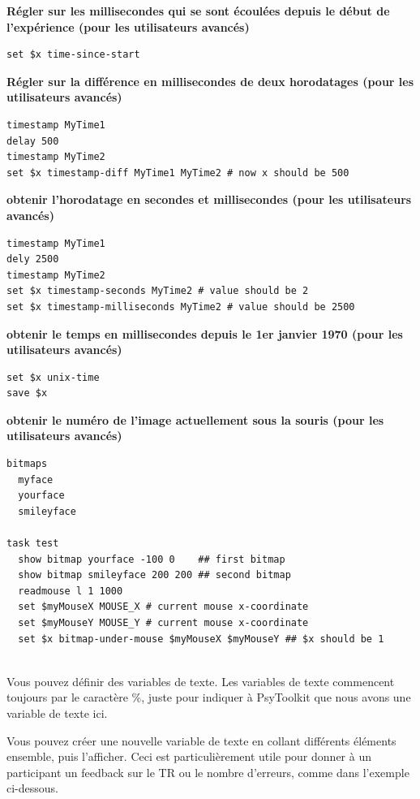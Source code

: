 \documentclass[
]{book}
\begin{document}
\textbf{Régler sur les millisecondes qui se sont écoulées depuis le début de l'expérience (pour les utilisateurs avancés)}

\begin{verbatim}
set $x time-since-start
\end{verbatim}

\textbf{Régler sur la différence en millisecondes de deux horodatages (pour les utilisateurs avancés)}

\begin{verbatim}
timestamp MyTime1
delay 500
timestamp MyTime2
set $x timestamp-diff MyTime1 MyTime2 # now x should be 500
\end{verbatim}

\textbf{obtenir l'horodatage en secondes et millisecondes (pour les utilisateurs avancés)}

\begin{verbatim}
timestamp MyTime1
dely 2500
timestamp MyTime2
set $x timestamp-seconds MyTime2 # value should be 2
set $x timestamp-milliseconds MyTime2 # value should be 2500
\end{verbatim}

\textbf{obtenir le temps en millisecondes depuis le 1er janvier 1970 (pour les utilisateurs avancés)}

\begin{verbatim}
set $x unix-time
save $x
\end{verbatim}

\textbf{obtenir le numéro de l'image actuellement sous la souris (pour les utilisateurs avancés)}

\begin{verbatim}
bitmaps
  myface
  yourface
  smileyface

task test
  show bitmap yourface -100 0    ## first bitmap
  show bitmap smileyface 200 200 ## second bitmap
  readmouse l 1 1000
  set $myMouseX MOUSE_X # current mouse x-coordinate
  set $myMouseY MOUSE_Y # current mouse x-coordinate
  set $x bitmap-under-mouse $myMouseX $myMouseY ## $x should be 1
  
\end{verbatim}

Vous pouvez définir des variables de texte. Les variables de texte commencent toujours par le caractère \%, juste pour indiquer à PsyToolkit que nous avons une variable de texte ici.

Vous pouvez créer une nouvelle variable de texte en collant différents éléments ensemble, puis l'afficher. Ceci est particulièrement utile pour donner à un participant un feedback sur le TR ou le nombre d'erreurs, comme dans l'exemple ci-dessous.
\end{document}

